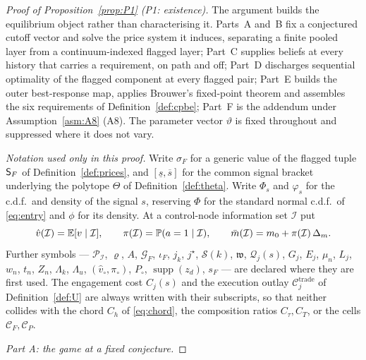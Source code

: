 \begin{proof}[Proof of Proposition~\ref{prop:P1} (P1: existence)]
The argument builds the equilibrium object rather than characterising it. Parts~A and~B fix a
conjectured cutoff vector and solve the price system it induces, separating a finite pooled layer
from a continuum-indexed flagged layer; Part~C supplies beliefs at every history that carries a
requirement, on path and off; Part~D discharges sequential optimality of the flagged component at
every flagged pair; Part~E builds the outer best-response map, applies Brouwer's fixed-point theorem
and assembles the six requirements of Definition~\ref{def:cpbe}; Part~F is the addendum under
Assumption~\ref{asm:A8} (A8). The parameter vector $\vartheta$ is fixed throughout and suppressed where it
does not vary.

\smallskip\noindent\emph{Notation used only in this proof.} Write $\sigma_F$ for a generic value of
the flagged tuple $\mathsf{S}_F$ of Definition~\ref{def:prices}, and
$[\underline s,\overline s]$ for the common signal bracket underlying the polytope $\Theta$ of
Definition~\ref{def:theta}. Write $\Phi_s$ and $\varphi_s$ for the c.d.f.\ and density of the signal
$s$, reserving $\Phi$ for the standard normal c.d.f.\ of \eqref{eq:entry} and $\phi$ for its density.
At a control-node information set $\mathcal I$ put
\[
\hat v(\mathcal I) = \mathbb{E}[v \mid \mathcal I],
\qquad
\pi(\mathcal I) = \mathbb{P}(a = 1 \mid \mathcal I),
\qquad
\bar m(\mathcal I) = m_0 + \pi(\mathcal I)\,\Delta_m .
\]
Further symbols --- $\mathcal P_{\mathcal I}$, $\varrho$, $A$, $\mathcal G_F$, $\iota_F$, $j_k$,
$j^\star$, $\mathcal S(k)$, $\mathfrak w$, $\mathcal Q_j(s)$, $G_j$, $E_j$, $\mu_n$, $L_j$, $w_n$,
$t_n$, $Z_n$, $\Lambda_k$, $\Lambda_u$, $(\hat v_\circ,\pi_\circ)$, $P_\circ$,
$\operatorname{supp}(z_d)$, $s_F$ --- are declared where they are first used. The engagement cost
$C_j(s)$ and the execution outlay $\mathcal C_j^{\mathrm{trade}}$ of Definition~\ref{def:U} are
always written with their subscripts, so that neither collides with the chord $C_h$ of
\eqref{eq:chord}, the composition ratios $C_\tau,C_T$, or the cells $\mathcal C_F,\mathcal C_P$.

\medskip
\noindent\emph{Part A: the game at a fixed conjecture.}


\end{proof}
